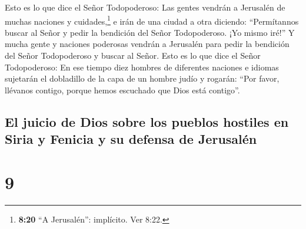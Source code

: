  Esto es lo que dice el Señor Todopoderoso: Las gentes
vendrán a Jerusalén de muchas naciones y cuidades,\footnote{\textbf{8:20}
  ``A Jerusalén'': implícito. Ver 8:22.}  e irán de una
ciudad a otra diciendo: ``Permítannos buscar al Señor y pedir la
bendición del Señor Todopoderoso. ¡Yo mismo iré!''  Y
mucha gente y naciones poderosas vendrán a Jerusalén para pedir la
bendición del Señor Todopoderoso y buscar al Señor.  Esto
es lo que dice el Señor Todopoderoso: En ese tiempo diez hombres de
diferentes naciones e idiomas sujetarán el dobladillo de la capa de un
hombre judío y rogarán: ``Por favor, llévanos contigo, porque hemos
escuchado que Dios está contigo''.

\hypertarget{el-juicio-de-dios-sobre-los-pueblos-hostiles-en-siria-y-fenicia-y-su-defensa-de-jerusaluxe9n}{%
\subsection{El juicio de Dios sobre los pueblos hostiles en Siria y
Fenicia y su defensa de
Jerusalén}\label{el-juicio-de-dios-sobre-los-pueblos-hostiles-en-siria-y-fenicia-y-su-defensa-de-jerusaluxe9n}}

\hypertarget{section-8}{%
\section{9}\label{section-8}}


